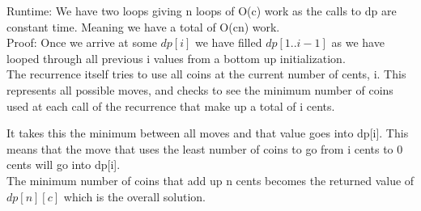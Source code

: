 \documentclass[11pt,letter]{article}
\newcommand{\2}{\{0, 1\}}
\newcommand{\1}{\mathds{1}}
\theoremstyle{definition}
\begin{document}

Runtime: We have two loops giving n loops of O(c) work as the calls to dp are constant time. Meaning we have a total of O(cn) work.\\

Proof: Once we arrive at some $dp[i]$ we have filled $dp[1..i-1]$ as we have looped through all previous i values from a bottom up initialization. \\

The recurrence itself tries to use all coins at the current number of cents, i. This represents all possible moves, and checks to see the minimum number of coins used at each call of the recurrence that make up a total of i cents. 

It takes this the minimum between all moves and that value goes into dp[i]. This means that the move that uses the least number of coins to go from i cents to 0 cents will go into dp[i].\\

The minimum number of coins that add up n cents becomes the returned value of $dp[n][c]$ which is the overall solution.\\
\end{document}
